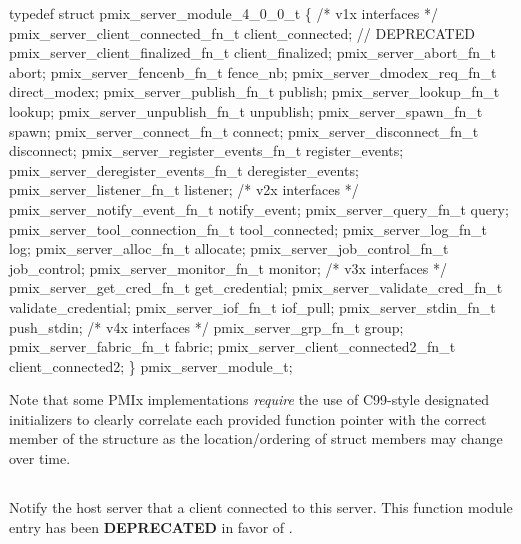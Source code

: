 \cspecificstart
\begin{codepar}
typedef struct pmix_server_module_4_0_0_t \{
    /* v1x interfaces */
    pmix_server_client_connected_fn_t   client_connected;  // DEPRECATED
    pmix_server_client_finalized_fn_t   client_finalized;
    pmix_server_abort_fn_t              abort;
    pmix_server_fencenb_fn_t            fence_nb;
    pmix_server_dmodex_req_fn_t         direct_modex;
    pmix_server_publish_fn_t            publish;
    pmix_server_lookup_fn_t             lookup;
    pmix_server_unpublish_fn_t          unpublish;
    pmix_server_spawn_fn_t              spawn;
    pmix_server_connect_fn_t            connect;
    pmix_server_disconnect_fn_t         disconnect;
    pmix_server_register_events_fn_t    register_events;
    pmix_server_deregister_events_fn_t  deregister_events;
    pmix_server_listener_fn_t           listener;
    /* v2x interfaces */
    pmix_server_notify_event_fn_t       notify_event;
    pmix_server_query_fn_t              query;
    pmix_server_tool_connection_fn_t    tool_connected;
    pmix_server_log_fn_t                log;
    pmix_server_alloc_fn_t              allocate;
    pmix_server_job_control_fn_t        job_control;
    pmix_server_monitor_fn_t            monitor;
    /* v3x interfaces */
    pmix_server_get_cred_fn_t           get_credential;
    pmix_server_validate_cred_fn_t      validate_credential;
    pmix_server_iof_fn_t                iof_pull;
    pmix_server_stdin_fn_t              push_stdin;
    /* v4x interfaces */
    pmix_server_grp_fn_t                group;
    pmix_server_fabric_fn_t             fabric;
    pmix_server_client_connected2_fn_t  client_connected2;
\} pmix_server_module_t;
\end{codepar}
\cspecificend

\advicermstart
Note that some \ac{PMIx} implementations \emph{require} the use of C99-style
designated initializers to clearly correlate each provided function pointer with the correct member of the  structure as the location/ordering of struct members may change over time.
\advicermend

\subsection{}

\summary

Notify the host server that a client connected to this server. This function module entry has been \textbf{DEPRECATED} in favor of .

